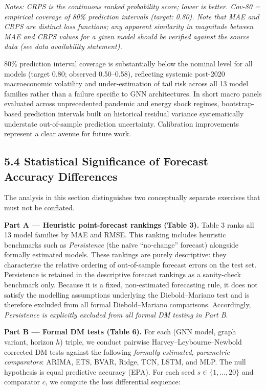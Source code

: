 \documentclass[
]{article}
\begin{document}
\emph{Notes: CRPS is the continuous ranked probability score; lower is
better. Cov-80 = empirical coverage of 80\% prediction intervals
(target: 0.80). Note that MAE and CRPS are distinct loss functions; any
apparent similarity in magnitude between MAE and CRPS values for a given
model should be verified against the source data (see data availability
statement).}

80\% prediction interval coverage is substantially below the nominal
level for all models (target 0.80; observed 0.50--0.58), reflecting systemic post-2020 macroeconomic volatility and under-estimation of tail risk across all 13 model families rather than a failure specific to GNN architectures. In short macro panels evaluated across unprecedented pandemic and energy shock regimes, bootstrap-based prediction intervals built on historical residual variance systematically understate out-of-sample prediction uncertainty. Calibration improvements represent a clear avenue for future work.

\subsection{5.4 Statistical Significance of Forecast Accuracy Differences}\label{statistical-significance-of-forecast-accuracy-differences}

The analysis in this section distinguishes two conceptually separate exercises that must not be conflated.

\textbf{Part A — Heuristic point-forecast rankings (Table 3).} Table 3 ranks all 13 model families by MAE and RMSE. This ranking includes heuristic benchmarks such as \emph{Persistence} (the na\"{i}ve ``no-change'' forecast) alongside formally estimated models. These rankings are purely descriptive: they characterise the relative ordering of out-of-sample forecast errors on the test set. Persistence is retained in the descriptive forecast rankings as a sanity-check benchmark only. Because it is a fixed, non-estimated forecasting rule, it does not satisfy the modelling assumptions underlying the Diebold--Mariano test and is therefore excluded from all formal Diebold--Mariano comparisons. Accordingly, \emph{Persistence is explicitly excluded from all formal DM testing in Part B}.

\textbf{Part B — Formal DM tests (Table 6).} For each (GNN model, graph variant, horizon $h$) triple, we conduct pairwise Harvey–Leybourne–Newbold corrected DM tests against the following \emph{formally estimated, parametric comparators}: ARIMA, ETS, BVAR, Ridge, TCN, LSTM, and MLP. The null hypothesis is equal predictive accuracy (EPA). For each seed $s \in \{1, \ldots, 20\}$ and comparator $c$, we compute the loss differential sequence:
\end{document}
